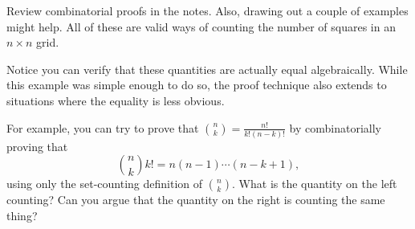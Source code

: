 \documentclass[11pt,preview]{standalone} %
\begin{document}
\begin{enumerate}
\begin{enumerate}
\begin{enumerate}
\begin{Multi}
\Hint Review combinatorial proofs in the notes. Also, drawing out a couple of examples might help.  
\Solution All of these are valid ways of counting the number of squares in an $n\times n$ grid.
\end{Multi}
\end{enumerate}
\end{enumerate}
Notice you can verify that these quantities are actually equal algebraically. While this example was simple enough to do so, the proof technique also extends to situations where the equality is less obvious. 

For example, you can try to prove that $\binom{n}{k} = \frac{n!}{k!(n-k)!}$ by combinatorially proving that \[
\binom{n}{k}k! = n(n-1) \cdots (n-k+1),\] 
using only the set-counting definition of $\binom{n}{k}$. What is the quantity on the left counting? Can you argue that the quantity on the right is counting the same thing?
\end{enumerate}
\end{document}
